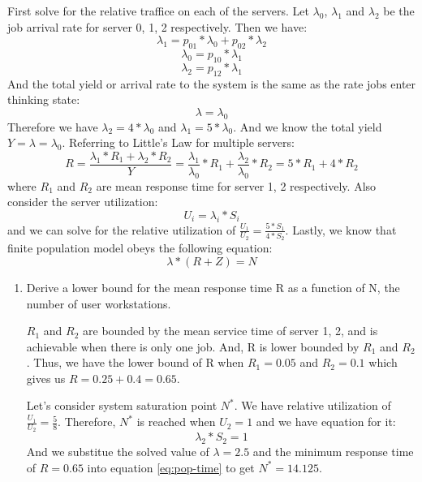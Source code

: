 \documentclass[letterpaper]{article}
\begin{document}
\begin{enumerate}
First solve for the relative traffice on each of the servers. Let $\lambda_0$, $\lambda_1$ and $\lambda_2$ be the job arrival rate for server 0, 1, 2 respectively. Then we have:
\begin{equation}
\lambda_1 = p_{01} * \lambda_0 + p_{02} * \lambda_2
\end{equation}
\begin{equation}
\lambda_0 =  p_{10} * \lambda_1
\end{equation}
\begin{equation}
\lambda_2 = p_{12} * \lambda_1
\end{equation}
And the total yield or arrival rate to the system is the same as the rate jobs enter thinking state:
\begin{equation}
\lambda = \lambda_0
\end{equation}
Therefore we have $\lambda_2 = 4 * \lambda_0$ and $\lambda_1 = 5 * \lambda_0$. And we know the total yield $Y = \lambda = \lambda_0$. Referring to Little's Law for multiple servers:
\begin{equation}
R = \frac{\lambda_1 * R_1 + \lambda_2 * R_2}{Y} = \frac{\lambda_1}{\lambda_0} * R_1 + \frac{\lambda_2}{\lambda_0} * R_2 = 5 * R_1 + 4 * R_2
\end{equation}
where $R_1$ and $R_2$ are mean response time for server 1, 2 respectively. Also consider the server utilization:
\begin{equation}
U_i = \lambda_i * S_i
\end{equation}
and we can solve for the relative utilization of $\frac{U_1}{U_2} = \frac{5 * S_1}{4 * S_2}$. Lastly, we know that finite population model obeys the following equation:
\begin{equation}\label{eq:pop-time}
\lambda * (R + Z) = N
\end{equation}

\begin{enumerate}
\item{} Derive a lower bound for the mean response time R as a function of N, the number of user workstations.

$R_1$ and $R_2$ are bounded by the mean service time of server 1, 2, and is achievable when there is only one job. And, R is lower bounded by $R_1$ and $R_2$. Thus, we have the lower bound of R when $R_1 = 0.05$ and $R_2 = 0.1$ which gives us $R = 0.25 + 0.4 = 0.65$.

Let's consider system saturation point $N^*$. We have relative utilization of $\frac{U_1}{U_2} = \frac{5}{8}$. Therefore, $N^*$ is reached when $U_2 = 1$ and we have equation for it:
\begin{equation}
\lambda_2 * S_2 = 1
\end{equation}
And we substitue the solved value of $\lambda = 2.5$ and the minimum response time of $R = 0.65$ into equation \ref{eq:pop-time} to get  $N^* = 14.125$.


\end{enumerate}
\end{enumerate}
\end{document}
